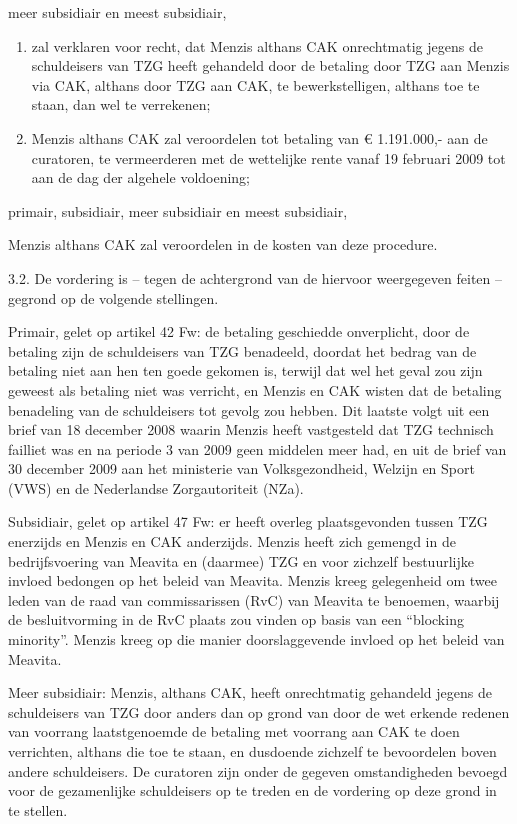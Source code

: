 \documentclass[
  dutch,
  a4paper,
]{article}
\begin{document}
meer subsidiair en meest subsidiair,

\begin{enumerate}
\def\labelenumi{(\roman{enumi})}
\item
  zal verklaren voor recht, dat Menzis althans CAK onrechtmatig jegens de schuldeisers van TZG heeft gehandeld door de betaling door TZG aan Menzis via CAK, althans door TZG aan CAK, te bewerkstelligen, althans toe te staan, dan wel te verrekenen;
\item
  Menzis althans CAK zal veroordelen tot betaling van € 1.191.000,- aan de curatoren, te vermeerderen met de wettelijke rente vanaf 19 februari 2009 tot aan de dag der algehele voldoening;
\end{enumerate}

primair, subsidiair, meer subsidiair en meest subsidiair,

Menzis althans CAK zal veroordelen in de kosten van deze procedure.

3.2. De vordering is -- tegen de achtergrond van de hiervoor weergegeven feiten -- gegrond op de volgende stellingen.

Primair, gelet op artikel 42 Fw: de betaling geschiedde onverplicht, door de betaling zijn de schuldeisers van TZG benadeeld, doordat het bedrag van de betaling niet aan hen ten goede gekomen is, terwijl dat wel het geval zou zijn geweest als betaling niet was verricht, en Menzis en CAK wisten dat de betaling benadeling van de schuldeisers tot gevolg zou hebben. Dit laatste volgt uit een brief van 18 december 2008 waarin Menzis heeft vastgesteld dat TZG technisch failliet was en na periode 3 van 2009 geen middelen meer had, en uit de brief van 30 december 2009 aan het ministerie van Volksgezondheid, Welzijn en Sport (VWS) en de Nederlandse Zorgautoriteit (NZa).

Subsidiair, gelet op artikel 47 Fw: er heeft overleg plaatsgevonden tussen TZG enerzijds en Menzis en CAK anderzijds. Menzis heeft zich gemengd in de bedrijfsvoering van Meavita en (daarmee) TZG en voor zichzelf bestuurlijke invloed bedongen op het beleid van Meavita. Menzis kreeg gelegenheid om twee leden van de raad van commissarissen (RvC) van Meavita te benoemen, waarbij de besluitvorming in de RvC plaats zou vinden op basis van een ``blocking minority''. Menzis kreeg op die manier doorslaggevende invloed op het beleid van Meavita.

Meer subsidiair: Menzis, althans CAK, heeft onrechtmatig gehandeld jegens de schuldeisers van TZG door anders dan op grond van door de wet erkende redenen van voorrang laatstgenoemde de betaling met voorrang aan CAK te doen verrichten, althans die toe te staan, en dusdoende zichzelf te bevoordelen boven andere schuldeisers. De curatoren zijn onder de gegeven omstandigheden bevoegd voor de gezamenlijke schuldeisers op te treden en de vordering op deze grond in te stellen.
\end{document}
